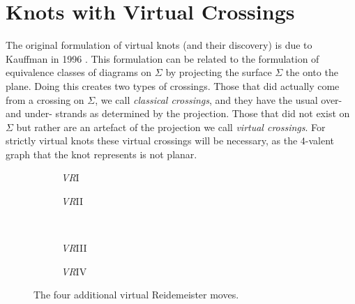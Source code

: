 \documentclass[12pt]{report}
\begin{document}
\section{Knots with Virtual Crossings}

The original formulation of virtual knots (and their discovery) is due to Kauffman in 1996 \cite{virtual-knot-theory}. This formulation can be related to the formulation of equivalence classes of diagrams on $\Sigma$ by projecting the surface $\Sigma$ the onto the plane. Doing this creates two types of crossings. Those that did actually come from a crossing on $\Sigma$, we call \textit{classical crossings}, and they have the usual over- and under- strands as determined by the projection. Those that did not exist on $\Sigma$ but rather are an artefact of the projection we call \textit{virtual crossings}. For strictly virtual knots these virtual crossings will be necessary, as the $4$-valent graph that the knot represents is not planar.

\begin{figure}[hbt]
	\centering
	\hspace*{\fill}
	\begin{subfigure}[b]{0.35 \textwidth}
		\centering
		\def\svgscale{0.22}
		
		\caption{\textit{VR}I}
	\end{subfigure}
	\hspace*{\fill}
	\begin{subfigure}[b]{0.35 \textwidth}
		\centering
		\def\svgscale{0.22}
		
		\caption{\textit{VR}II}
	\end{subfigure}
	\hspace*{\fill}
	\\
	\hspace*{\fill}
	\begin{subfigure}[b]{0.35 \textwidth}
		\centering
		\def\svgscale{0.22}
		
		\caption{\textit{VR}III}
	\end{subfigure}
	\hspace*{\fill}
	\begin{subfigure}[b]{0.35 \textwidth}
		\centering
		\def\svgscale{0.22}
		
		\caption{\textit{VR}IV}
	\end{subfigure}
	\hspace*{\fill}
	\caption{The four additional virtual Reidemeister moves.}
	\label{fig:virtual-reidemeister-moves}
\end{figure}
\end{document}
